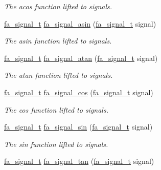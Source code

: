 \begin{DoxyCompactItemize}
\begin{DoxyCompactList}\small\item\em The acos function lifted to signals. \end{DoxyCompactList}\item 
\hyperlink{group___fa_signal_gac5c72f160cd6e93a6783551627b166e5}{fa\-\_\-signal\-\_\-t} \hyperlink{group___fa_signal_ga0acf71563e4997e7389641584c3bc4a0}{fa\-\_\-signal\-\_\-asin} (\hyperlink{group___fa_signal_gac5c72f160cd6e93a6783551627b166e5}{fa\-\_\-signal\-\_\-t} signal)
\begin{DoxyCompactList}\small\item\em The asin function lifted to signals. \end{DoxyCompactList}\item 
\hyperlink{group___fa_signal_gac5c72f160cd6e93a6783551627b166e5}{fa\-\_\-signal\-\_\-t} \hyperlink{group___fa_signal_ga8912ad21c16376adbb2858ef3e404297}{fa\-\_\-signal\-\_\-atan} (\hyperlink{group___fa_signal_gac5c72f160cd6e93a6783551627b166e5}{fa\-\_\-signal\-\_\-t} signal)
\begin{DoxyCompactList}\small\item\em The atan function lifted to signals. \end{DoxyCompactList}\item 
\hyperlink{group___fa_signal_gac5c72f160cd6e93a6783551627b166e5}{fa\-\_\-signal\-\_\-t} \hyperlink{group___fa_signal_gaa4d0bbf3c083d973fdca65463fc9205b}{fa\-\_\-signal\-\_\-cos} (\hyperlink{group___fa_signal_gac5c72f160cd6e93a6783551627b166e5}{fa\-\_\-signal\-\_\-t} signal)
\begin{DoxyCompactList}\small\item\em The cos function lifted to signals. \end{DoxyCompactList}\item 
\hyperlink{group___fa_signal_gac5c72f160cd6e93a6783551627b166e5}{fa\-\_\-signal\-\_\-t} \hyperlink{group___fa_signal_ga5c256237a8453e45f82cf5af39d67fcd}{fa\-\_\-signal\-\_\-sin} (\hyperlink{group___fa_signal_gac5c72f160cd6e93a6783551627b166e5}{fa\-\_\-signal\-\_\-t} signal)
\begin{DoxyCompactList}\small\item\em The sin function lifted to signals. \end{DoxyCompactList}\item 
\hyperlink{group___fa_signal_gac5c72f160cd6e93a6783551627b166e5}{fa\-\_\-signal\-\_\-t} \hyperlink{group___fa_signal_ga7f7ef8c12f64af67cadb1d1f4d3331a3}{fa\-\_\-signal\-\_\-tan} (\hyperlink{group___fa_signal_gac5c72f160cd6e93a6783551627b166e5}{fa\-\_\-signal\-\_\-t} signal)

\end{DoxyCompactItemize}
